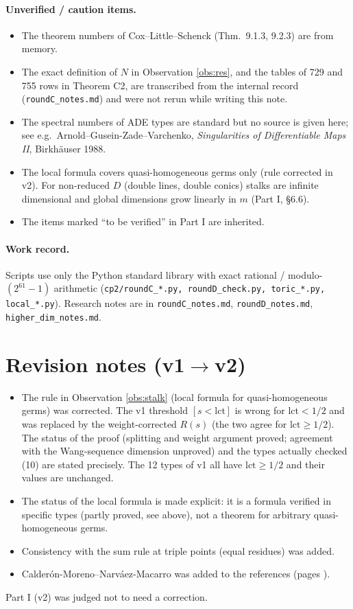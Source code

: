 \paragraph{Unverified / caution items.}
\begin{itemize}
\item The theorem numbers of Cox--Little--Schenck (Thm.\ 9.1.3, 9.2.3) are from memory.\tQ
\item The exact definition of $N$ in Observation \ref{obs:res}, and the tables of 729 and 755 rows in Theorem C2, are transcribed from the internal record (\texttt{roundC\_notes.md}) and were not rerun while writing this note.\tQ
\item The spectral numbers of ADE types are standard but no source is given here; see e.g.\ Arnold--Gusein-Zade--Varchenko, \emph{Singularities of Differentiable Maps II}, Birkh\"auser 1988.\tQ
\item The local formula covers quasi-homogeneous germs only (rule corrected in v2). For non-reduced $D$ (double lines, double conics) stalks are infinite dimensional and global dimensions grow linearly in $m$ (Part I, \S6.6).
\item The items marked ``to be verified'' in Part I are inherited.
\end{itemize}

\paragraph{Work record.} Scripts use only the Python standard library with exact rational / modulo-$(2^{61}-1)$ arithmetic (\texttt{cp2/roundC\_*.py, roundD\_check.py, toric\_*.py, local\_*.py}). Research notes are in \texttt{roundC\_notes.md}, \texttt{roundD\_notes.md}, \texttt{higher\_dim\_notes.md}.


\section{Revision notes (v1$\to$v2)}\label{sec:rev}
\begin{itemize}
\item The rule in Observation \ref{obs:stalk} (local formula for quasi-homogeneous germs) was corrected. The v1 threshold $[s<\mathrm{lct}]$ is wrong for $\mathrm{lct}<1/2$ and was replaced by the weight-corrected $R(s)$ (the two agree for $\mathrm{lct}\ge1/2$). The status of the proof (splitting and weight argument proved; agreement with the Wang-sequence dimension unproved) and the types actually checked (10) are stated precisely. The 12 types of v1 all have $\mathrm{lct}\ge1/2$ and their values are unchanged.
\item The status of the local formula is made explicit: it is a formula verified in specific types (partly proved, see above), not a theorem for arbitrary quasi-homogeneous germs.
\item Consistency with the sum rule at triple points (equal residues) was added.
\item Calder\'on-Moreno--Narv\'aez-Macarro was added to the references (pages \tQ).
\end{itemize}
Part I (v2) was judged not to need a correction.

